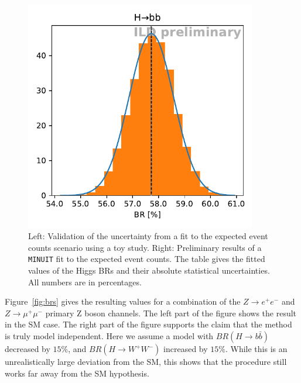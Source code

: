 \documentclass[a4paper,11pt]{article}
\begin{document}
\begin{figure}[ht]
    \begin{minipage}[c]{0.5\textwidth}
      \centering
      \includegraphics[width=0.9\textwidth, keepaspectratio]{toy_H_bb}
    \end{minipage}
    \begin{minipage}[c]{0.5\textwidth}
      \centering
      
    \end{minipage}
    \caption{
        Left: Validation of the uncertainty from
        a fit to the expected event counts scenario using a toy study.
        Right:
        Preliminary results of a \texttt{MINUIT} fit to the expected event counts.
        The table gives the fitted values of the Higgs BRs
        and their absolute statistical uncertainties.
        All numbers are in percentages.
    }\label{fig:toys}
\end{figure}

Figure~\ref{fig:brs} gives the resulting values for a combination of the
$Z \to e^+e^-$ and $Z \to \mu^+\mu^-$ primary Z boson channels.
The left part of the figure shows the result in the SM case.
The right part of the figure supports the claim that the method
is truly model independent.
Here we assume a model with $BR(H \to b \bar{b})$ decreased by $15\%$,
and $BR(H \to W^+W^-)$ increased by $15\%$.
While this is an unrealistically large deviation from the SM, this shows that
the procedure still works far away from the SM hypothesis.
\end{document}
